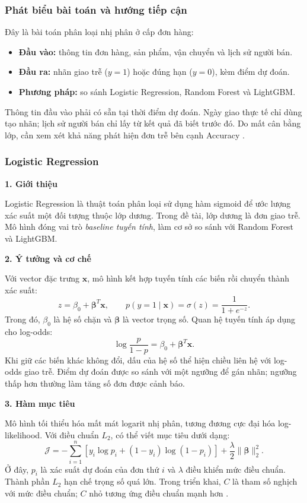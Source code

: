 \documentclass[a4paper]{article}
\begin{document}
\subsubsection{Phát biểu bài toán và hướng tiếp cận}
Đây là bài toán phân loại nhị phân ở cấp đơn hàng:
\begin{itemize}
    \item \textbf{Đầu vào:} thông tin đơn hàng, sản phẩm, vận chuyển và lịch sử người bán.
    \item \textbf{Đầu ra:} nhãn giao trễ ($y=1$) hoặc đúng hạn ($y=0$), kèm điểm dự đoán.
    \item \textbf{Phương pháp:} so sánh Logistic Regression, Random Forest và LightGBM.
\end{itemize}
Thông tin đầu vào phải có sẵn tại thời điểm dự đoán. Ngày giao thực tế chỉ dùng tạo nhãn; lịch sử người bán chỉ lấy từ kết quả đã biết trước đó. Do mất cân bằng lớp, cần xem xét khả năng phát hiện đơn trễ bên cạnh Accuracy \cite{hartman2026}.

\subsubsection{Logistic Regression}
\noindent\textbf{1. Giới thiệu}\par
Logistic Regression là thuật toán phân loại sử dụng hàm sigmoid để ước lượng xác suất một đối tượng thuộc lớp dương. Trong đề tài, lớp dương là đơn giao trễ. Mô hình đóng vai trò \textit{baseline tuyến tính}, làm cơ sở so sánh với Random Forest và LightGBM.

\noindent\textbf{2. Ý tưởng và cơ chế}\par
Với vector đặc trưng $\mathbf{x}$, mô hình kết hợp tuyến tính các biến rồi chuyển thành xác suất:
\[
z=\beta_0+\boldsymbol{\beta}^{T}\mathbf{x},\qquad
p(y=1\mid\mathbf{x})=\sigma(z)=\frac{1}{1+e^{-z}}.
\]
Trong đó, $\beta_0$ là hệ số chặn và $\boldsymbol{\beta}$ là vector trọng số. Quan hệ tuyến tính áp dụng cho log-odds:
\[
\log\frac{p}{1-p}=\beta_0+\boldsymbol{\beta}^{T}\mathbf{x}.
\]
Khi giữ các biến khác không đổi, dấu của hệ số thể hiện chiều liên hệ với log-odds giao trễ. Điểm dự đoán được so sánh với một ngưỡng để gán nhãn; ngưỡng thấp hơn thường làm tăng số đơn được cảnh báo.

\noindent\textbf{3. Hàm mục tiêu}\par
Mô hình tối thiểu hóa mất mát logarit nhị phân, tương đương cực đại hóa log-likelihood. Với điều chuẩn $L_2$, có thể viết mục tiêu dưới dạng:
\[
\mathcal{J}=-\sum_{i=1}^{n}
\left[y_i\log p_i+(1-y_i)\log(1-p_i)\right]
+\frac{\lambda}{2}\|\boldsymbol{\beta}\|_2^2.
\]
Ở đây, $p_i$ là xác suất dự đoán của đơn thứ $i$ và $\lambda$ điều khiển mức điều chuẩn. Thành phần $L_2$ hạn chế trọng số quá lớn. Trong triển khai, $C$ là tham số nghịch với mức điều chuẩn; $C$ nhỏ tương ứng điều chuẩn mạnh hơn \cite{logisticTheory}.
\end{document}
